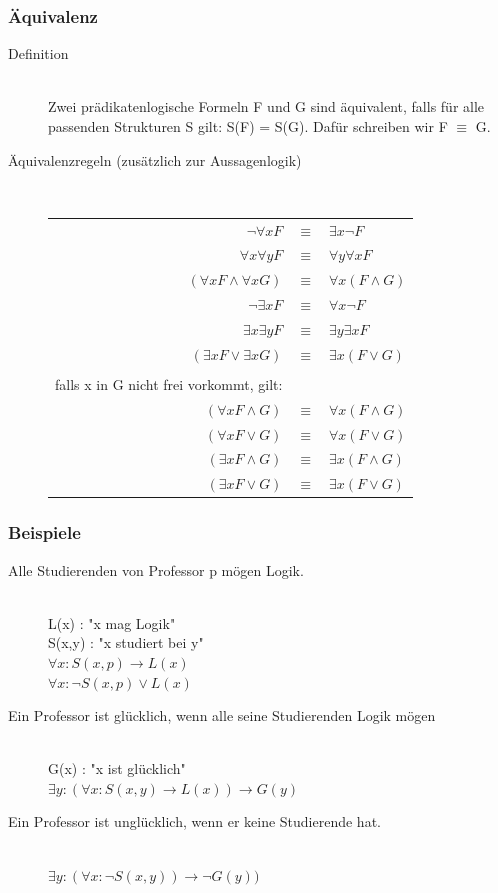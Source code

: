 \documentclass[a4paper,10pt]{article}
\newcommand{\ra}{\rightarrow}
\begin{document}
\subsubsection{\"Aquivalenz}
\begin{description}
	\item[Definition] \hfill \\
		Zwei pr\"adikatenlogische Formeln F und G sind \"aquivalent, falls f\"ur alle passenden Strukturen S gilt: S(F) = S(G). Daf\"ur schreiben wir F $\equiv$ G.
	\item[\"Aquivalenzregeln (zus\"atzlich zur Aussagenlogik)] \hfill \\
	\begin{tabular}{rcl}
		$\neg \forall x F $&$\equiv$&$ \exists x \neg F$ \\
		$\forall x \forall y F $&$\equiv$&$ \forall y \forall x F$ \\
		$(\forall x F \wedge \forall x G) $&$\equiv$&$ \forall x (F \wedge G)$ \\
		$\neg \exists x F $&$\equiv$&$ \forall x \neg F$ \\		
		$\exists x \exists y F $&$\equiv$&$ \exists y \exists x F$ \\
		$(\exists x F \vee \exists x G) $&$\equiv$&$ \exists x (F \vee G)$ \\ \\
		falls x in G nicht frei vorkommt, gilt: \\
		$(\forall x F \wedge G) $&$\equiv$&$ \forall x (F \wedge G)$ \\
		$(\forall x F \vee G) $&$\equiv$&$ \forall x (F \vee G)$ \\
		$(\exists x F \wedge G) $&$\equiv$&$ \exists x (F \wedge G)$ \\
		$(\exists x F \vee G) $&$\equiv$&$ \exists x (F \vee G)$ \\
	\end{tabular}
\end{description}

\subsubsection{Beispiele}
\begin{description}
	\item[Alle Studierenden von Professor p m\"ogen Logik.] \hfill \\
		L(x) : "x mag Logik" \\
		S(x,y) : "x studiert bei y" \\
		$\forall x: S(x,p) \ra L(x)$ \\
		$\forall x: \neg S(x,p) \vee L(x)$
	\item[Ein Professor ist gl\"ucklich, wenn alle seine Studierenden Logik m\"ogen] \hfill \\
		G(x) : "x ist gl\"ucklich" \\
		$\exists y: (\forall x : S(x,y) \ra L(x)) \ra G(y)$
	\item[Ein Professor ist ungl\"ucklich, wenn er keine Studierende hat.] \hfill \\
		$\exists y: (\forall x : \neg S(x,y)) \ra \neg G(y))$
\end{description}
\end{document}

